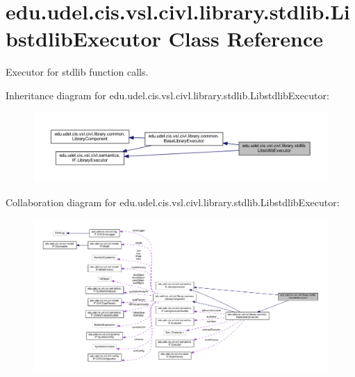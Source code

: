 \hypertarget{classedu_1_1udel_1_1cis_1_1vsl_1_1civl_1_1library_1_1stdlib_1_1LibstdlibExecutor}{}\section{edu.\+udel.\+cis.\+vsl.\+civl.\+library.\+stdlib.\+Libstdlib\+Executor Class Reference}
\label{classedu_1_1udel_1_1cis_1_1vsl_1_1civl_1_1library_1_1stdlib_1_1LibstdlibExecutor}


Executor for stdlib function calls.  




Inheritance diagram for edu.\+udel.\+cis.\+vsl.\+civl.\+library.\+stdlib.\+Libstdlib\+Executor\+:
\nopagebreak
\begin{figure}[H]
\begin{center}
\leavevmode
\includegraphics[width=350pt]{classedu_1_1udel_1_1cis_1_1vsl_1_1civl_1_1library_1_1stdlib_1_1LibstdlibExecutor__inherit__graph}
\end{center}
\end{figure}


Collaboration diagram for edu.\+udel.\+cis.\+vsl.\+civl.\+library.\+stdlib.\+Libstdlib\+Executor\+:
\nopagebreak
\begin{figure}[H]
\begin{center}
\leavevmode
\includegraphics[width=350pt]{classedu_1_1udel_1_1cis_1_1vsl_1_1civl_1_1library_1_1stdlib_1_1LibstdlibExecutor__coll__graph}
\end{center}
\end{figure}
